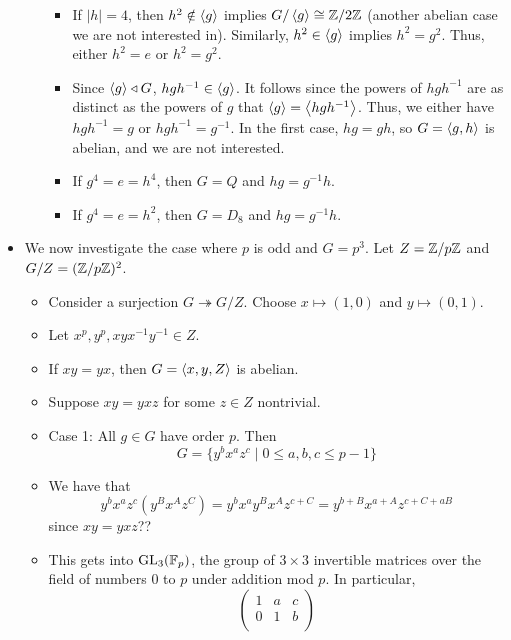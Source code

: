 \documentclass[../notes.tex]{subfiles}
\begin{document}
\begin{itemize}
\begin{itemize}
\begin{itemize}
            \item If $|h|=4$, then $h^2\notin\left\langle{g}\right\rangle$ implies $G/\left\langle{g}\right\rangle\cong\mathbb{Z}/2\mathbb{Z}$ (another abelian case we are not interested in). Similarly, $h^2\in\left\langle{g}\right\rangle$ implies $h^2=g^2$. Thus, either $h^2=e$ or $h^2=g^2$.
            \item Since $\left\langle{g}\right\rangle\triangleleft G$, $hgh^{-1}\in\left\langle{g}\right\rangle$. It follows since the powers of $hgh^{-1}$ are as distinct as the powers of $g$ that $\left\langle{g}\right\rangle=\left\langle{hgh^{-1}}\right\rangle$. Thus, we either have $hgh^{-1}=g$ or $hgh^{-1}=g^{-1}$. In the first case, $hg=gh$, so $G=\left\langle{g,h}\right\rangle$ is abelian, and we are not interested.
            \item If $g^4=e=h^4$, then $G=Q$ and $hg=g^{-1}h$.
            \item If $g^4=e=h^2$, then $G=D_8$ and $hg=g^{-1}h$.
        \end{itemize}
    \end{itemize}
    \item We now investigate the case where $p$ is odd and $G=p^3$. Let $Z=\mathbb{Z}/p\mathbb{Z}$ and $G/Z=(\mathbb{Z}/p\mathbb{Z})^2$.
    \begin{itemize}
        \item Consider a surjection $G\twoheadrightarrow G/Z$. Choose $x\mapsto(1,0)$ and $y\mapsto(0,1)$.
        \item Let $x^p,y^p,xyx^{-1}y^{-1}\in Z$.
        \item If $xy=yx$, then $G=\left\langle{x,y,Z}\right\rangle$ is abelian.
        \item Suppose $xy=yxz$ for some $z\in Z$ nontrivial.
        \item Case 1: All $g\in G$ have order $p$. Then
        \begin{equation*}
            G = \{y^bx^az^c\mid 0\leq a,b,c\leq p-1\}
        \end{equation*}
        \item We have that
        \begin{equation*}
            y^bx^az^c(y^Bx^Az^C) = y^bx^ay^Bx^Az^{c+C}
            = y^{b+B}x^{a+A}z^{c+C+aB}
        \end{equation*}
        since $xy=yxz$??
        \item This gets into $\text{GL}_3(\mathbb{F}_p)$, the group of $3\times 3$ invertible matrices over the field of numbers 0 to $p$ under addition mod $p$. In particular,
        \begin{equation*}
            \begin{pmatrix}
                1 & a & c\\
                0 & 1 & b\\

\end{pmatrix}
\end{equation*}
\end{itemize}
\end{itemize}
\end{document}

